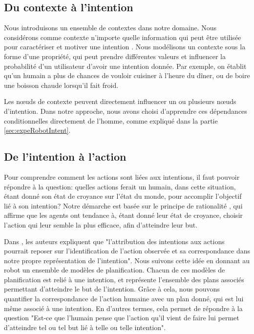 \documentclass[a4paper,11pt,twoside]{StyleThese}
\begin{document}
\subsection{Du contexte à l'intention}
Nous introduisons un ensemble de contextes dans notre domaine. Nous considérons comme contexte n'importe quelle information qui peut être utilisée pour caractériser et motiver une intention \cite{abowd1999towards}. Nous modélisons un contexte sous la forme d'une propriété, qui peut prendre différentes valeurs et influencer la probabilité d'un utilisateur d'avoir une intention donnée. Par exemple, on établit qu'un humain a plus de chances de vouloir cuisiner à l'heure du dîner, ou de boire une boisson chaude lorsqu'il fait froid.

Les nœuds de contexte peuvent directement influencer un ou plusieurs nœuds d'intention. Dans notre approche, nous avons choisi d'apprendre ces dépendances conditionnelles directement de l'homme, comme expliqué dans la partie \ref{sec:expeRobotIntent}.

\subsection{De l'intention à l'action}
\label{action_evaluation}
Pour comprendre comment les actions sont liées aux intentions, il faut pouvoir répondre à la question: quelles actions ferait un humain, dans cette situation, étant donné son état de croyance sur l'état du monde, pour accomplir l'objectif lié à son intention? 
Notre démarche est basée sur le principe de rationalité \cite{Dennet1989}, qui affirme que les agents ont tendance à, étant donné leur état de croyance, choisir l'action qui leur semble la plus efficace, afin d'atteindre leur but.

Dans \cite{Blakemore2001}, les auteurs expliquent que "l'attribution des intentions aux actions pourrait reposer sur l'identification de l'action observée et sa correspondance dans notre propre représentation de l'intention". Nous suivons cette idée en donnant au robot un ensemble de modèles de planification. Chacun de ces modèles de planification est relié à une intention, et représente l'ensemble des plans associés permettant d'atteindre le but de l'intention. Grâce à cela, nous pouvons quantifier la correspondance de l'action humaine avec un plan donné, qui est lui même associé à une intention. En d'autres termes, cela permet de répondre à la question "Est-ce que l'humain pense que l'action qu'il vient de faire lui permet d'atteindre tel ou tel but lié à telle ou telle intention".
\end{document}
